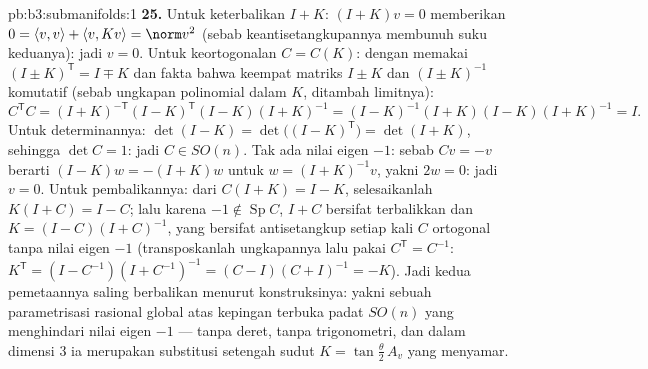 \begin{solution}{pb:b3:submanifolds:1}
\textbf{25.} Untuk keterbalikan $I + K$: $(I + K)v = 0$ memberikan $0 =
\langle v, v\rangle + \langle v, Kv\rangle = \norm v^2$
(sebab keantisetangkupannya membunuh suku keduanya): jadi $v = 0$. Untuk keortogonalan
$C = C(K)$: dengan memakai $(I \pm K)^{\mathsf T} = I \mp K$ dan
fakta bahwa keempat matriks $I \pm K$ dan $(I \pm K)^{-1}$
komutatif (sebab ungkapan polinomial dalam $K$, ditambah limitnya):
\[
C^{\mathsf T}C = (I + K)^{-\mathsf T}(I - K)^{\mathsf T}
(I - K)(I + K)^{-1}
= (I - K)^{-1}(I + K)(I - K)(I + K)^{-1} = I .
\]
Untuk determinannya: $\det(I - K) = \det\bigl((I - K)^{\mathsf
T}\bigr) = \det(I + K)$, sehingga $\det C = 1$: jadi $C \in SO(n)$.
Tak ada nilai eigen $-1$: sebab $Cv = -v$ berarti $(I - K)w = -(I + K)w$
untuk $w = (I + K)^{-1}v$, yakni $2w = 0$: jadi $v = 0$.
Untuk pembalikannya: dari $C(I + K) = I - K$, selesaikanlah $K(I + C) = I -
C$; lalu karena $-1 \notin \operatorname{Sp}C$, $I + C$ bersifat
terbalikkan dan $K = (I - C)(I + C)^{-1}$, yang bersifat
antisetangkup setiap kali $C$ ortogonal tanpa nilai eigen
$-1$ (transposkanlah ungkapannya lalu pakai $C^{\mathsf T} =
C^{-1}$: $K^{\mathsf T} = (I - C^{-1})(I + C^{-1})^{-1} =
(C - I)(C + I)^{-1} = -K$). Jadi kedua pemetaannya saling
berbalikan menurut konstruksinya: yakni sebuah parametrisasi rasional global
atas kepingan terbuka padat $SO(n)$ yang menghindari nilai eigen $-1$
--- tanpa deret, tanpa trigonometri, dan dalam dimensi $3$ ia
merupakan substitusi setengah sudut $K = \tan\frac\theta2\,A_v$ yang menyamar.

\end{solution}
